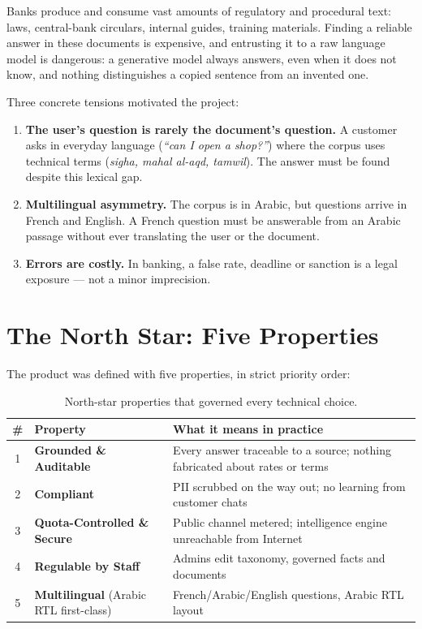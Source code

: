 \documentclass[a4paper,12pt]{report}
\begin{document}
Banks produce and consume vast amounts of regulatory and procedural text: laws, central-bank circulars, internal guides, training materials. Finding a reliable answer in these documents is expensive, and entrusting it to a raw language model is dangerous: a generative model always answers, even when it does not know, and nothing distinguishes a copied sentence from an invented one.

Three concrete tensions motivated the project:

\begin{enumerate}[leftmargin=1.2cm, itemsep=3pt]
\item \textbf{The user's question is rarely the document's question.} A customer asks in everyday language (\textit{``can I open a shop?''}) where the corpus uses technical terms (\textit{sigha, mahal al-aqd, tamwil}). The answer must be found despite this lexical gap.
\item \textbf{Multilingual asymmetry.} The corpus is in Arabic, but questions arrive in French and English. A French question must be answerable from an Arabic passage without ever translating the user or the document.
\item \textbf{Errors are costly.} In banking, a false rate, deadline or sanction is a legal exposure --- not a minor imprecision.
\end{enumerate}

\section{The North Star: Five Properties}

The product was defined with five properties, in strict priority order:

\begin{table}[H]
\centering\small
\begin{tabular}{clp{9.5cm}}
\toprule
\textbf{\#} & \textbf{Property} & \textbf{What it means in practice} \\
\midrule
1 & \textbf{Grounded \& Auditable} & Every answer traceable to a source; nothing fabricated about rates or terms \\
2 & \textbf{Compliant} & PII scrubbed on the way out; no learning from customer chats \\
3 & \textbf{Quota-Controlled \& Secure} & Public channel metered; intelligence engine unreachable from Internet \\
4 & \textbf{Regulable by Staff} & Admins edit taxonomy, governed facts and documents \\
5 & \textbf{Multilingual} (Arabic RTL first-class) & French/Arabic/English questions, Arabic RTL layout \\
\bottomrule
\end{tabular}
\caption{North-star properties that governed every technical choice.}
\end{table}
\end{document}
